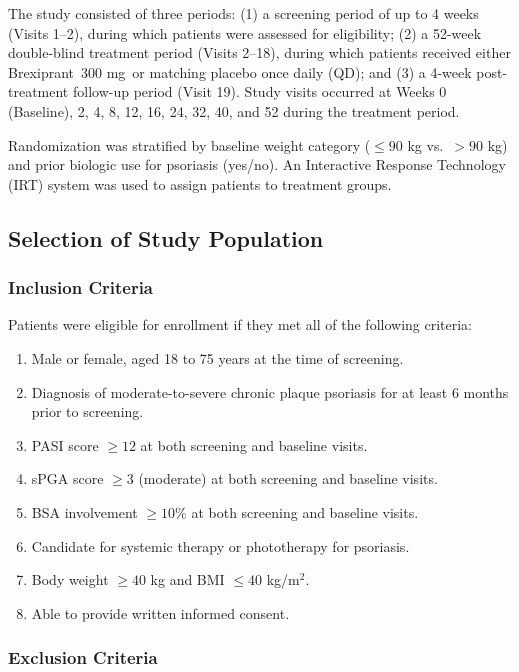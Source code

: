 \documentclass[11pt, a4paper]{article}
\newcommand{\studydrug}{Brexiprant}
\newcommand{\studydose}{300 mg}
\begin{document}
The study consisted of three periods: (1) a screening period of up to 4 weeks (Visits 1--2), during which patients were assessed for eligibility; (2) a 52-week double-blind treatment period (Visits 2--18), during which patients received either \studydrug\ \studydose\ or matching placebo once daily (QD); and (3) a 4-week post-treatment follow-up period (Visit 19). Study visits occurred at Weeks 0 (Baseline), 2, 4, 8, 12, 16, 24, 32, 40, and 52 during the treatment period.

\vspace{4pt}
Randomization was stratified by baseline weight category ($\le 90$ kg vs.\ $> 90$ kg) and prior biologic use for psoriasis (yes/no). An Interactive Response Technology (IRT) system was used to assign patients to treatment groups.

\subsection{Selection of Study Population}

\subsubsection{Inclusion Criteria}

Patients were eligible for enrollment if they met all of the following criteria:
\begin{enumerate}[label=\textbullet, leftmargin=*]
  \item Male or female, aged 18 to 75 years at the time of screening.
  \item Diagnosis of moderate-to-severe chronic plaque psoriasis for at least 6 months prior to screening.
  \item PASI score $\ge 12$ at both screening and baseline visits.
  \item sPGA score $\ge 3$ (moderate) at both screening and baseline visits.
  \item BSA involvement $\ge 10\%$ at both screening and baseline visits.
  \item Candidate for systemic therapy or phototherapy for psoriasis.
  \item Body weight $\ge 40$ kg and BMI $\le 40$ kg/m$^2$.
  \item Able to provide written informed consent.
\end{enumerate}

\subsubsection{Exclusion Criteria}
\end{document}
